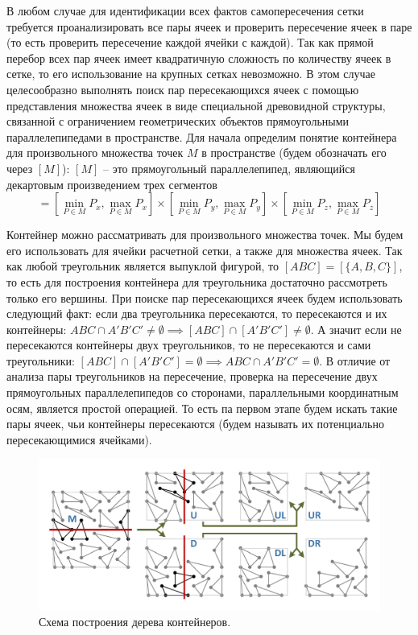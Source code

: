 В любом случае для идентификации всех фактов самопересечения сетки требуется проанализировать все пары ячеек и проверить пересечение ячеек в паре (то есть проверить пересечение каждой ячейки с каждой).
Так как прямой перебор всех пар ячеек имеет квадратичную сложность по количеству ячеек в сетке, то его использование на крупных сетках невозможно.
В этом случае целесообразно выполнять поиск пар пересекающихся ячеек с помощью представления множества ячеек в виде специальной древовидной структуры, связанной с ограничением геометрических объектов прямоугольными параллелепипедами в пространстве.
Для начала определим понятие контейнера для произвольного множества точек $M$ в пространстве (будем обозначать его через $[M]$): $[M]$ -- это прямоугольный параллелепипед, являющийся декартовым произведением трех сегментов
\begin{equation}
[M] = \left[\min_{P \in M}{P_x}, \max_{P \in M}{P_x}\right]
      \times \left[\min_{P \in M}{P_y}, \max_{P \in M}{P_y}\right]
      \times \left[\min_{P \in M}{P_z}, \max_{P \in M}{P_z}\right]
\end{equation}

Контейнер можно рассматривать для произвольного множества точек.
Мы будем его использовать для ячейки расчетной сетки, а также для множества ячеек.
Так как любой треугольник является выпуклой фигурой, то $[ABC] = [\{A, B, C\}]$, то есть для построения контейнера для треугольника достаточно рассмотреть только его вершины.
При поиске пар пересекающихся ячеек будем использовать следующий факт: если два треугольника пересекаются, то пересекаются и их контейнеры: $ABC \cap A'B'C' \ne \emptyset \implies [ABC] \cap [A'B'C'] \ne \emptyset$.
А значит если не пересекаются контейнеры двух треугольников, то не пересекаются и сами треугольники: $[ABC] \cap [A'B'C'] = \emptyset \implies ABC \cap A'B'C' = \emptyset$.
В отличие от анализа пары треугольников на пересечение, проверка на пересечение двух прямоугольных параллелепипедов со сторонами, параллельными координатным осям, является простой операцией.
То есть па первом этапе будем искать такие пары ячеек, чьи контейнеры пересекаются (будем называть их потенциально пересекающимися ячейками).

\begin{figure}[h]
\centering
\includegraphics[width=1.0\textwidth]{pics/text_1_int/pic_box.pdf}
\caption{Схема построения дерева контейнеров.}\label{fig:text_1_int_box_tree}
\end{figure}


